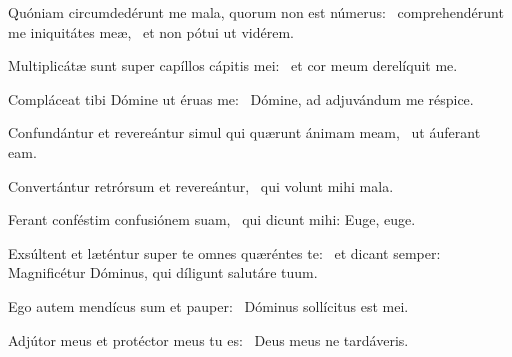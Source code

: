\item Quóniam circumdedérunt me mala, quorum non est númerus:~\pscross{} comprehendérunt me iniquitátes meæ,~\psstar{} et non pótui ut vidérem.

\item Multiplicátæ sunt super capíllos cápitis mei:~\psstar{} et cor meum derelíquit me.

\item Compláceat tibi Dómine ut éruas me:~\psstar{} Dómine, ad adjuvándum me réspice.

\item Confundántur et revereántur simul qui quærunt ánimam meam,~\psstar{} ut áuferant eam.

\item Convertántur retrórsum et revereántur,~\psstar{} qui volunt mihi mala.

\item Ferant conféstim confusiónem suam,~\psstar{} qui dicunt mihi: Euge, euge.

\item Exsúltent et læténtur super te omnes quæréntes te:~\psstar{} et dicant semper: Magnificétur Dóminus, qui díligunt salutáre tuum.

\item Ego autem mendícus sum et pauper:~\psstar{} Dóminus sollícitus est mei.

\item Adjútor meus et protéctor meus tu es:~\psstar{} Deus meus ne tardáveris.

